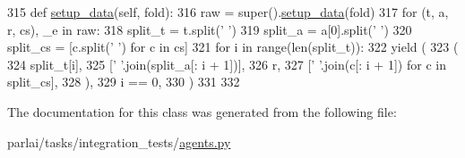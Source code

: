 \begin{DoxyCode}
315     \textcolor{keyword}{def }\hyperlink{namespaceparlai_1_1tasks_1_1multinli_1_1agents_a4fa2cb0ba1ed745336ad8bceed36b841}{setup\_data}(self, fold):
316         raw = super().\hyperlink{namespaceparlai_1_1tasks_1_1multinli_1_1agents_a4fa2cb0ba1ed745336ad8bceed36b841}{setup\_data}(fold)
317         \textcolor{keywordflow}{for} (t, a, r, cs), \_e \textcolor{keywordflow}{in} raw:
318             split\_t = t.split(\textcolor{stringliteral}{' '})
319             split\_a = a[0].split(\textcolor{stringliteral}{' '})
320             split\_cs = [c.split(\textcolor{stringliteral}{' '}) \textcolor{keywordflow}{for} c \textcolor{keywordflow}{in} cs]
321             \textcolor{keywordflow}{for} i \textcolor{keywordflow}{in} range(len(split\_t)):
322                 \textcolor{keywordflow}{yield} (
323                     (
324                         split\_t[i],
325                         [\textcolor{stringliteral}{' '}.join(split\_a[: i + 1])],
326                         r,
327                         [\textcolor{stringliteral}{' '}.join(c[: i + 1]) \textcolor{keywordflow}{for} c \textcolor{keywordflow}{in} split\_cs],
328                     ),
329                     i == 0,
330                 )
331 
332 
\end{DoxyCode}


The documentation for this class was generated from the following file\+:\begin{DoxyCompactItemize}
\item 
parlai/tasks/integration\+\_\+tests/\hyperlink{parlai_2tasks_2integration__tests_2agents_8py}{agents.\+py}\end{DoxyCompactItemize}
